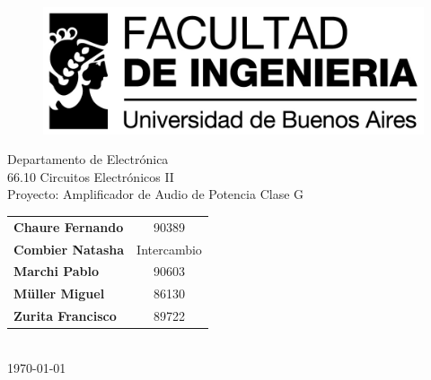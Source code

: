 %
%
\thispagestyle{empty}

\begin{figure}[t]
    \centering
    \includegraphics [scale=0.72]{img/logo_fiuba_alta.jpg}
\end{figure}

\vspace{5.5cm}

\begin{center}
    \Large{Departamento de Electrónica}\\
    \huge{66.10 Circuitos Electrónicos II}\\
    \vspace{.5cm}
    \large{Proyecto: Amplificador de Audio de Potencia Clase G}\\
    \vspace{1cm}
    \begin{tabular}{lc}
    \textbf{Chaure Fernando} & 90389 \\
    \textbf{Combier Natasha} & Intercambio \\    
    \textbf{Marchi Pablo} & 90603 \\
    \textbf{Müller Miguel} & 86130 \\
    \textbf{Zurita Francisco} & 89722 \\ 
    \end{tabular}\\
    \vspace{.3cm}
    \small{\today}\\
\end{center}

\vspace{1.5cm}

